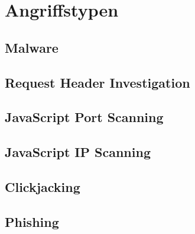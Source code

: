 \section{Angriffstypen}

\subsection{Malware}

\subsection{Request Header Investigation}

\subsection{JavaScript Port Scanning}

\subsection{JavaScript IP Scanning}

\subsection{Clickjacking}

\subsection{Phishing}
